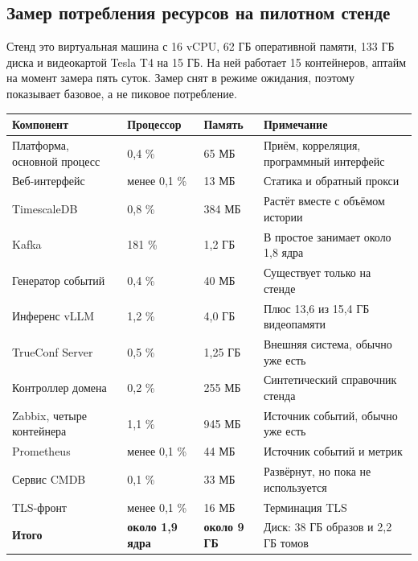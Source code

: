\documentclass[11pt]{article}
\begin{document}
\subsection{Замер потребления ресурсов на пилотном стенде}
Стенд это виртуальная машина с 16 vCPU, 62 ГБ оперативной памяти, 133 ГБ
диска и видеокартой Tesla T4 на 15 ГБ. На ней работает 15 контейнеров, аптайм
на момент замера пять суток. Замер снят в режиме ожидания, поэтому показывает
базовое, а не пиковое потребление.
\begin{longtable}{|L{5.6cm}|L{2.2cm}|L{2.4cm}|L{5.6cm}|}
\hline
\textbf{Компонент} & \textbf{Процессор} & \textbf{Память} & \textbf{Примечание} \\ \hline
Платформа, основной процесс & 0,4 \% & 65 МБ & Приём, корреляция, программный интерфейс \\ \hline
Веб-интерфейс & менее 0,1 \% & 13 МБ & Статика и обратный прокси \\ \hline
TimescaleDB & 0,8 \% & 384 МБ & Растёт вместе с объёмом истории \\ \hline
Kafka & 181 \% & 1,2 ГБ & В простое занимает около 1,8 ядра \\ \hline
Генератор событий & 0,4 \% & 40 МБ & Существует только на стенде \\ \hline
Инференс vLLM & 1,2 \% & 4,0 ГБ & Плюс 13,6 из 15,4 ГБ видеопамяти \\ \hline
TrueConf Server & 0,5 \% & 1,25 ГБ & Внешняя система, обычно уже есть \\ \hline
Контроллер домена & 0,2 \% & 255 МБ & Синтетический справочник стенда \\ \hline
Zabbix, четыре контейнера & 1,1 \% & 945 МБ & Источник событий, обычно уже есть \\ \hline
Prometheus & менее 0,1 \% & 44 МБ & Источник событий и метрик \\ \hline
Сервис CMDB & 0,1 \% & 33 МБ & Развёрнут, но пока не используется \\ \hline
TLS-фронт & менее 0,1 \% & 16 МБ & Терминация TLS \\ \hline
\textbf{Итого} & \textbf{около 1,9 ядра} & \textbf{около 9 ГБ} & Диск: 38 ГБ образов и 2,2 ГБ томов \\ \hline
\end{longtable}
\end{document}
